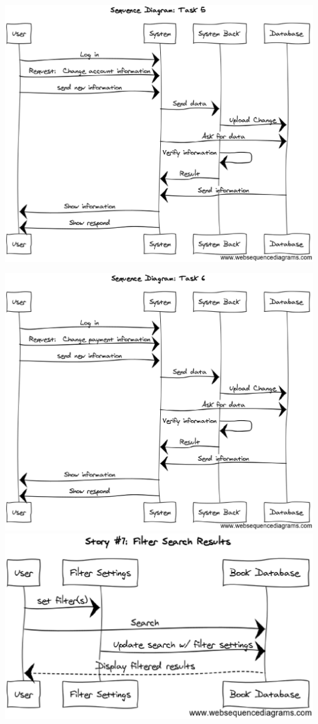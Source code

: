 \documentclass[12pt]{article}
\begin{document}
		\par
		\includegraphics[width=16cm]{story5.eps}
		\par
		\includegraphics[width=16cm]{story6.eps}
		\clearpage
 		\includegraphics[width=16cm]{story7.eps}
\end{document}
